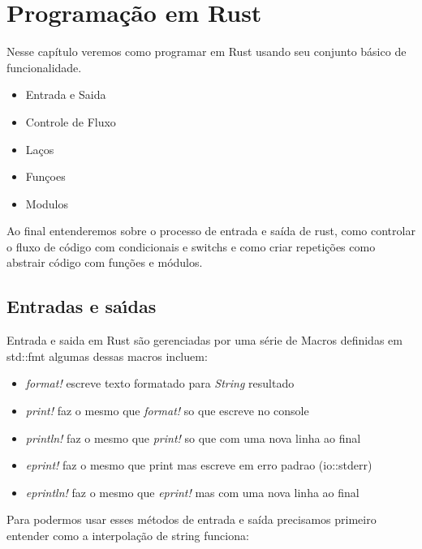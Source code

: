 

\chapter{ Programa\c{c}\~{a}o em Rust}

Nesse capítulo veremos como programar em Rust usando seu conjunto básico de funcionalidade.
\begin{itemize}
  \item Entrada e Saida
  \item Controle de Fluxo
  \item La\c{c}os
  \item Fun\c{c}oes
  \item Modulos
\end{itemize}

Ao final entenderemos sobre o processo de entrada e saída de rust, como controlar o fluxo de código com condicionais e switchs e como criar repetições como abstrair código com funções e módulos.

\section{Entradas e sa\'{\i}das}

Entrada e saida em Rust são gerenciadas por uma série de Macros definidas em std::fmt algumas dessas macros incluem:
\begin{itemize}
  \item \textit{format!} escreve texto formatado para \textit{String} resultado
  \item \textit{print!} faz o mesmo que \textit{format!} so que escreve no console
  \item \textit{println!} faz o mesmo que \textit{print!} so que com uma nova linha ao final
  \item \textit{eprint!} faz o mesmo que print mas escreve em erro padrao (io::stderr)
  \item \textit{eprintln!} faz o mesmo que \textit{eprint!} mas com uma nova linha ao final
\end{itemize}
\par
Para podermos usar esses métodos de entrada e saída precisamos primeiro entender como a interpolação de string funciona:

